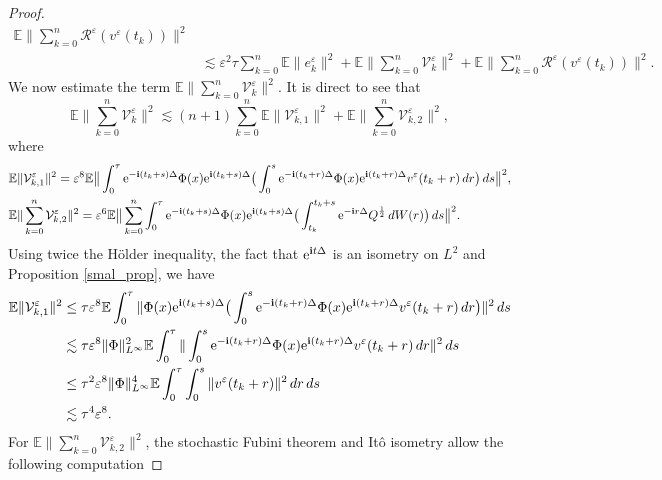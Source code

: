 \documentclass[a4paper]{amsart}
\begin{document}
\begin{proof}
\begin{align*}
\mathbb{E}\|\sum_{k=0}^n \mathcal{R}^\varepsilon(v^\varepsilon(t_k))\|^{2}\\
&\lesssim \varepsilon^2\tau \sum_{k=0}^{n}\mathbb{E}\|e^\varepsilon_k\|^{2}+\mathbb{E}\|\sum_{k=0}^n \mathcal{V}^\varepsilon_k\|^{2}+
\mathbb{E}\|\sum_{k=0}^n \mathcal{R}^\varepsilon(v^\varepsilon(t_k))\|^{2}.
\end{align*}
We now estimate the term $\mathbb{E}\|\displaystyle\sum_{k=0}^{n}\mathcal{V}^\varepsilon_k\|^{2}$. It is direct to see that
$$
\mathbb{E}\|\displaystyle\sum_{k=0}^{n}\mathcal{V}^\varepsilon_k\|^{2}\lesssim (n+1)\displaystyle\sum_{k=0}^{n}\mathbb{E}\|\mathcal{V}^\varepsilon_{k,1}\|^{2}+\mathbb{E}\|\displaystyle\sum_{k=0}^{n} \mathcal{V}^\varepsilon_{k,2}\|^{2},
$$
where
\begin{align*}
  &  \mathbb{E}\|\mathcal{V}^\varepsilon_{k,1}\|^{2}=\varepsilon^{8}\mathbb{E}\big\|\int_{0}^{\tau}{\rm e}^{-{\bf i}(t_k+s)\Delta} \Phi(x){\rm e}^{{\bf i}(t_k+s)\Delta}\big(\int_{0}^{s}{\rm e}^{-{\bf i}(t_k+r)\Delta}\Phi(x){\rm e}^{{\bf i}(t_k+r)\Delta}v^\varepsilon(t_k+r)\,dr\big)\,ds\big\|^{2},\\
&\mathbb{E}\|\displaystyle\sum_{k=0}^{n}\mathcal{V}^\varepsilon_{k,2}\|^{2}=\varepsilon^{6}\mathbb{E}\big\|\displaystyle\sum_{k=0}^n\int_{0}^{\tau}{\rm e}^{-{\bf i}(t_k+s)\Delta} \Phi(x){\rm e}^{{\bf i}(t_k+s)\Delta}\big(\int_{t_k}^{t_k+s}{\rm e}^{-{\bf i}r \Delta}Q^{\frac{1}{2}}\,dW(r)\big)\,ds\big\|^{2}.
\end{align*}
Using twice the Hölder inequality, the fact that ${\rm e}^{{\bf i}t\Delta}$ is an isometry on $L^2$ and Proposition \ref{smal_prop},  we have
\begin{align*}
\mathbb{E}\|\mathcal{V}^\varepsilon_{k,1}\|^{2} & \le \tau \varepsilon^8  \mathbb{E}\int_{0}^{\tau}\|\Phi(x){\rm e}^{{\bf i}(t_k+s)\Delta}\big(\int_{0}^{s}{\rm e}^{-{\bf i}(t_k+r)\Delta}\Phi(x){\rm e}^{{\bf i}(t_k+r)\Delta}v^\varepsilon(t_k+r)\,dr\big)\|^{2}\,ds\\
&\lesssim \tau \varepsilon^{8} \|\Phi\|_{L^\infty}^{2} \mathbb{E}\int_{0}^{\tau}\|\int_{0}^{s}{\rm e}^{-{\bf i}(t_k+r)\Delta}\Phi(x){\rm e}^{{\bf i}(t_k+r)\Delta}v^\varepsilon(t_k+r)\,dr\|^{2}\,ds\\
&\le \tau^{2} \varepsilon^{8} \|\Phi\|^{4}_{L^\infty} \mathbb{E}\int_{0}^{\tau}\int_{0}^{s}\|v^\varepsilon(t_k+r)\|^{2}\,dr\,ds\\
&\lesssim \tau^4 \varepsilon^8.
\end{align*}
For $\mathbb{E}\|\displaystyle\sum_{k=0}^n\mathcal{V}^\varepsilon_{k,2}\|^{2}$, the stochastic Fubini theorem and Itô isometry allow the following computation

\end{proof}
\end{document}

